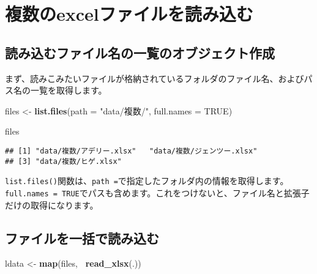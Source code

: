 \documentclass[
  xelatex,ja=standard, b5paper]{bxjsbook}
\newenvironment{Shaded}{\begin{snugshade}}{\end{snugshade}}
\newcommand{\DataTypeTok}[1]{\textcolor[rgb]{0.13,0.29,0.53}{#1}}
\newcommand{\KeywordTok}[1]{\textcolor[rgb]{0.13,0.29,0.53}{\textbf{#1}}}
\newcommand{\NormalTok}[1]{#1}
\newcommand{\OperatorTok}[1]{\textcolor[rgb]{0.81,0.36,0.00}{\textbf{#1}}}
\newcommand{\OtherTok}[1]{\textcolor[rgb]{0.56,0.35,0.01}{#1}}
\newcommand{\StringTok}[1]{\textcolor[rgb]{0.31,0.60,0.02}{#1}}
\begin{document}
\hypertarget{ux8907ux6570ux306eexcelux30d5ux30a1ux30a4ux30ebux3092ux8aadux307fux8fbcux3080}{%
\chapter{複数のexcelファイルを読み込む}\label{ux8907ux6570ux306eexcelux30d5ux30a1ux30a4ux30ebux3092ux8aadux307fux8fbcux3080}}

\hypertarget{ux8aadux307fux8fbcux3080ux30d5ux30a1ux30a4ux30ebux540dux306eux4e00ux89a7ux306eux30aaux30d6ux30b8ux30a7ux30afux30c8ux4f5cux6210}{%
\section{読み込むファイル名の一覧のオブジェクト作成}\label{ux8aadux307fux8fbcux3080ux30d5ux30a1ux30a4ux30ebux540dux306eux4e00ux89a7ux306eux30aaux30d6ux30b8ux30a7ux30afux30c8ux4f5cux6210}}

まず、読みこみたいファイルが格納されているフォルダのファイル名、およびパス名の一覧を取得します。

\begin{Shaded}
\begin{Highlighting}[]
\NormalTok{files <-}
\StringTok{    }\KeywordTok{list.files}\NormalTok{(}\DataTypeTok{path =} \StringTok{"data/複数/"}\NormalTok{, }\DataTypeTok{full.names =} \OtherTok{TRUE}\NormalTok{)}

\NormalTok{files}
\end{Highlighting}
\end{Shaded}

\begin{verbatim}
## [1] "data/複数/アデリー.xlsx"   "data/複数/ジェンツー.xlsx"
## [3] "data/複数/ヒゲ.xlsx"
\end{verbatim}

\texttt{list.files()}関数は、\texttt{path\ =}で指定したフォルダ内の情報を取得します。\texttt{full.names\ =\ TRUE}でパスも含めます。これをつけないと、ファイル名と拡張子だけの取得になります。

\hypertarget{ux30d5ux30a1ux30a4ux30ebux3092ux4e00ux62ecux3067ux8aadux307fux8fbcux3080}{%
\section{ファイルを一括で読み込む}\label{ux30d5ux30a1ux30a4ux30ebux3092ux4e00ux62ecux3067ux8aadux307fux8fbcux3080}}

\begin{Shaded}
\begin{Highlighting}[]
\NormalTok{ldata <-}
\StringTok{    }\KeywordTok{map}\NormalTok{(files, }\OperatorTok{~}\KeywordTok{read_xlsx}\NormalTok{(.))}
\end{Highlighting}
\end{Shaded}
\end{document}
